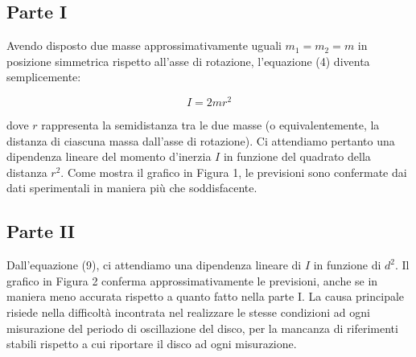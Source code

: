 

\subsection{Parte I} Avendo disposto due masse approssimativamente uguali $m_1 = m_2 = m$ in posizione simmetrica rispetto all'asse di rotazione, l'equazione (4) diventa semplicemente:

\begin{equation}
    I = 2mr^2
\end{equation}

dove $r$ rappresenta la semidistanza tra le due masse (o equivalentemente, la distanza di ciascuna massa dall'asse di rotazione). Ci attendiamo pertanto una dipendenza lineare del momento d'inerzia $I$ in funzione del quadrato della distanza $r^2$. Come mostra il grafico in Figura 1, le previsioni sono confermate dai dati sperimentali in maniera più che soddisfacente.

\subsection{Parte II}

Dall'equazione (9), ci attendiamo una dipendenza lineare di $I$ in funzione di $d^2$. Il grafico in Figura 2 conferma approssimativamente le previsioni, anche se in maniera meno accurata rispetto a quanto fatto nella parte I. La causa principale risiede nella difficoltà incontrata nel realizzare le stesse condizioni ad ogni misurazione del periodo di oscillazione del disco, per la mancanza di riferimenti stabili rispetto a cui riportare il disco ad ogni misurazione.